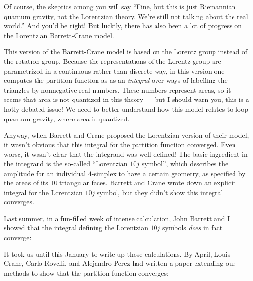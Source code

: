 \documentclass{article}
\def\tightlist{}
\renewcommand{\texttt}[1]{%
  \begingroup
  \ttfamily
  \begingroup\lccode`~=`/\lowercase{\endgroup\def~}{/\discretionary{}{}{}}%
  \begingroup\lccode`~=`[\lowercase{\endgroup\def~}{[\discretionary{}{}{}}%
  \begingroup\lccode`~=`.\lowercase{\endgroup\def~}{.\discretionary{}{}{}}%
  \catcode`/=\active\catcode`[=\active\catcode`.=\active
  \scantokens{#1\noexpand}%
  \endgroup
}
\begin{document}
Of course, the skeptics among you will say ``Fine, but this is just
Riemannian quantum gravity, not the Lorentzian theory. We're still not
talking about the real world.'' And you'd be right! But luckily, there
has also been a lot of progress on the Lorentzian Barrett-Crane model.

This version of the Barrett-Crane model is based on the Lorentz group
instead of the rotation group. Because the representations of the
Lorentz group are parametrized in a continuous rather than discrete way,
in this version one computes the partition function as as an
\emph{integral} over ways of labelling the triangles by nonnegative real
numbers. These numbers represent areas, so it seems that area is not
quantized in this theory --- but I should warn you, this is a hotly
debated issue! We need to better understand how this model relates to
loop quantum gravity, where area is quantized.

Anyway, when Barrett and Crane proposed the Lorentzian version of their
model, it wasn't obvious that this integral for the partition function
converged. Even worse, it wasn't clear that the integrand was
well-defined! The basic ingredient in the integrand is the so-called
``Lorentzian \(10j\) symbol'', which describes the amplitude for an
individual \(4\)-simplex to have a certain geometry, as specified by the
areas of its 10 triangular faces. Barrett and Crane wrote down an
explicit integral for the Lorentzian \(10j\) symbol, but they didn't
show this integral converges.

Last summer, in a fun-filled week of intense calculation, John Barrett
and I showed that the integral defining the Lorentzian \(10j\) symbols
\emph{does} in fact converge:


It took us until this January to write up those calculations. By April,
Louis Crane, Carlo Rovelli, and Alejandro Perez had written a paper
extending our methods to show that the partition function converges:

\end{document}
